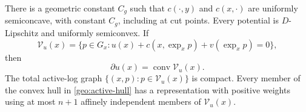 \begin{lemma}
\label{geo:prelim}
There is a geometric constant $C_g$ such that $c(\cdot,y)$ and
$c(x,\cdot)$ are uniformly semiconcave, with constant $C_g$, including
at cut points.  Every potential is $D$-Lipschitz and uniformly
semiconvex.  If
\[
 \mathcal V_u(x)=\{p\in G_x:
                 u(x)+c(x,\exp_xp)+v(\exp_xp)=0\},
\]
then
\begin{equation}
 \label{geo:active-hull}
 \partial u(x)=\operatorname{conv}\mathcal V_u(x).
\end{equation}
The total active-log graph
$\{(x,p):p\in\mathcal V_u(x)\}$ is compact. Every member of the convex
hull in \eqref{geo:active-hull} has a representation with positive weights using at most $n+1$
affinely independent members of $\mathcal V_u(x)$.
\end{lemma}

